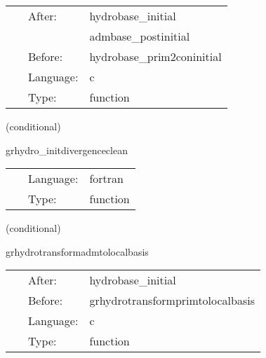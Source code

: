 \documentclass{article}
\begin{document}
\hspace{5mm}

 \begin{tabular*}{160mm}{cll} 
~ & After:  & hydrobase\_initial \\ 
~& ~ &admbase\_postinitial\\ 
~ & Before:  & hydrobase\_prim2coninitial \\ 
~ & Language:  & c \\ 
~ & Type:  & function \\ 
\end{tabular*} 


\vspace{5mm}

   (conditional) 

\hspace{5mm} grhydro\_initdivergenceclean 

\hspace{5mm}{\it set psi for divergence cleaning initially to zero } 


\hspace{5mm}

 \begin{tabular*}{160mm}{cll} 
~ & Language:  & fortran \\ 
~ & Type:  & function \\ 
\end{tabular*} 


\vspace{5mm}

   (conditional) 

\hspace{5mm} grhydrotransformadmtolocalbasis 

\hspace{5mm}{\it transform adm metric, extr. curv. and shift to local tensor basis. } 


\hspace{5mm}

 \begin{tabular*}{160mm}{cll} 
~ & After:  & hydrobase\_initial \\ 
~ & Before:  & grhydrotransformprimtolocalbasis \\ 
~ & Language:  & c \\ 
~ & Type:  & function \\ 
\end{tabular*} 


\vspace{5mm}
\end{document}
